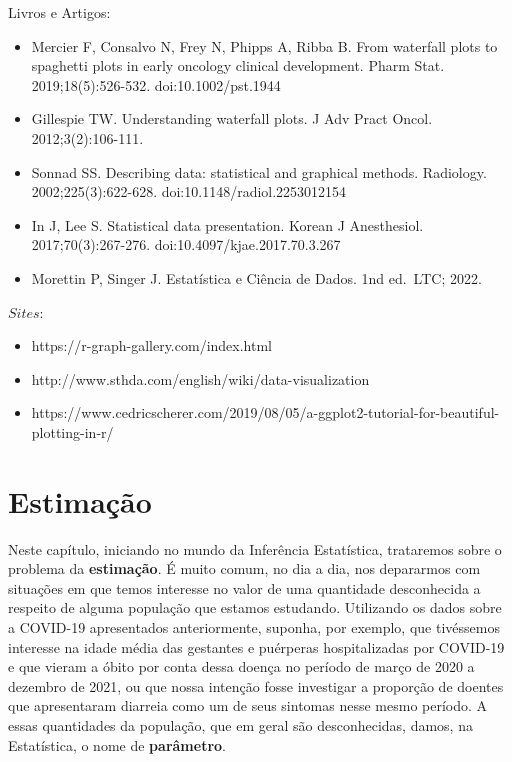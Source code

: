 \documentclass[
  letterpaper,
  DIV=11,
  numbers=noendperiod]{scrreprt}
\providecommand{\tightlist}{%
  \setlength{\itemsep}{0pt}\setlength{\parskip}{0pt}}\usepackage{longtable,booktabs,array}
\begin{document}
Livros e Artigos:

\begin{itemize}
\item
  Mercier F, Consalvo N, Frey N, Phipps A, Ribba B. From waterfall plots
  to spaghetti plots in early oncology clinical development. Pharm Stat.
  2019;18(5):526-532. doi:10.1002/pst.1944
\item
  Gillespie TW. Understanding waterfall plots. J Adv Pract Oncol.
  2012;3(2):106-111.
\item
  Sonnad SS. Describing data: statistical and graphical methods.
  Radiology. 2002;225(3):622-628. doi:10.1148/radiol.2253012154
\item
  In J, Lee S. Statistical data presentation. Korean J Anesthesiol.
  2017;70(3):267-276. doi:10.4097/kjae.2017.70.3.267
\item
  Morettin P, Singer J. Estatística e Ciência de Dados. 1nd ed.~LTC;
  2022.
\end{itemize}

\(Sites\):

\begin{itemize}
\tightlist
\item
  https://r-graph-gallery.com/index.html\\
\item
  http://www.sthda.com/english/wiki/data-visualization
\item
  https://www.cedricscherer.com/2019/08/05/a-ggplot2-tutorial-for-beautiful-plotting-in-r/
\end{itemize}


\hypertarget{estimauxe7uxe3o}{%
\chapter{Estimação}\label{estimauxe7uxe3o}}

Neste capítulo, iniciando no mundo da Inferência Estatística, trataremos
sobre o problema da \textbf{estimação}. É muito comum, no dia a dia, nos
depararmos com situações em que temos interesse no valor de uma
quantidade desconhecida a respeito de alguma população que estamos
estudando. Utilizando os dados sobre a COVID-19 apresentados
anteriormente, suponha, por exemplo, que tivéssemos interesse na idade
média das gestantes e puérperas hospitalizadas por COVID-19 e que vieram
a óbito por conta dessa doença no período de março de 2020 a dezembro de
2021, ou que nossa intenção fosse investigar a proporção de doentes que
apresentaram diarreia como um de seus sintomas nesse mesmo período. A
essas quantidades da população, que em geral são desconhecidas, damos,
na Estatística, o nome de \textbf{parâmetro}.
\end{document}
